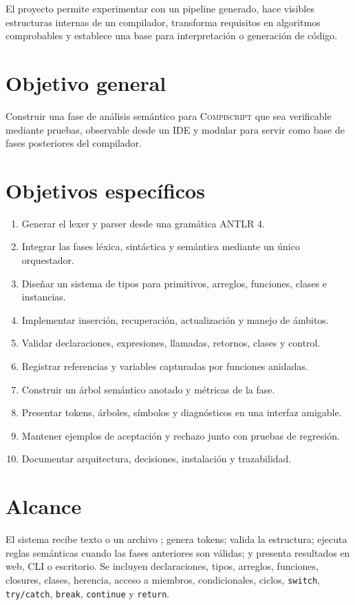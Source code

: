 \documentclass[11pt,letterpaper,oneside]{report}
\newcommand{\archivo}[1]{\path{#1}}
\newcommand{\codigo}[1]{\texttt{#1}}
\newcommand{\Compiscript}{\textsc{Compiscript}}
\newcommand{\ANTLR}{ANTLR 4}
\begin{document}
El proyecto permite experimentar con un pipeline generado, hace visibles estructuras
internas de un compilador, transforma requisitos en algoritmos comprobables y
establece una base para interpretación o generación de código.

\section{Objetivo general}

Construir una fase de análisis semántico para \Compiscript{} que sea verificable
mediante pruebas, observable desde un IDE y modular para servir como base de fases
posteriores del compilador.

\section{Objetivos específicos}

\begin{enumerate}
  \item Generar el lexer y parser desde una gramática \ANTLR.
  \item Integrar las fases léxica, sintáctica y semántica mediante un único orquestador.
  \item Diseñar un sistema de tipos para primitivos, arreglos, funciones, clases e instancias.
  \item Implementar inserción, recuperación, actualización y manejo de ámbitos.
  \item Validar declaraciones, expresiones, llamadas, retornos, clases y control.
  \item Registrar referencias y variables capturadas por funciones anidadas.
  \item Construir un árbol semántico anotado y métricas de la fase.
  \item Presentar tokens, árboles, símbolos y diagnósticos en una interfaz amigable.
  \item Mantener ejemplos de aceptación y rechazo junto con pruebas de regresión.
  \item Documentar arquitectura, decisiones, instalación y trazabilidad.
\end{enumerate}

\section{Alcance}

El sistema recibe texto o un archivo \archivo{.cps}; genera tokens; valida la
estructura; ejecuta reglas semánticas cuando las fases anteriores son válidas; y
presenta resultados en web, CLI o escritorio. Se incluyen declaraciones, tipos,
arreglos, funciones, closures, clases, herencia, acceso a miembros, condicionales,
ciclos, \codigo{switch}, \codigo{try/catch}, \codigo{break}, \codigo{continue} y
\codigo{return}.
\end{document}

